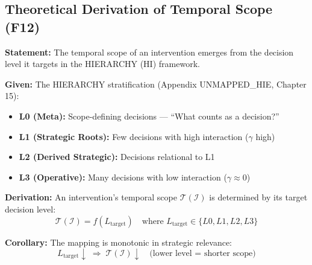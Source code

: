 \subsection{Theoretical Derivation of Temporal Scope (F12)}
\label{sec:hhh-temporal}

\begin{tcolorbox}[colback=blue!5!white, colframe=blue!75!black,
    title=\textbf{Theorem HHH-T2: Temporal Scope Emergence from HIERARCHY}]

\textbf{Statement:} The temporal scope of an intervention emerges from the decision level it targets in the HIERARCHY (HI) framework.

\textbf{Given:} The HIERARCHY stratification (Appendix UNMAPPED_HIE, Chapter 15):
\begin{itemize}[nosep]
    \item \textbf{L0 (Meta):} Scope-defining decisions --- ``What counts as a decision?''
    \item \textbf{L1 (Strategic Roots):} Few decisions with high interaction ($\gamma$ high)
    \item \textbf{L2 (Derived Strategic):} Decisions relational to L1
    \item \textbf{L3 (Operative):} Many decisions with low interaction ($\gamma \approx 0$)
\end{itemize}

\textbf{Derivation:} An intervention's temporal scope $\mathcal{T}(\mathcal{I})$ is determined by its target decision level:
\begin{equation}
\mathcal{T}(\mathcal{I}) = f(L_{\text{target}}) \quad \text{where } L_{\text{target}} \in \{L0, L1, L2, L3\}
\label{eq:hhh-temporal-mapping}
\end{equation}

\textbf{Corollary:} The mapping is monotonic in strategic relevance:
\begin{equation}
L_{\text{target}} \downarrow \; \Rightarrow \; \mathcal{T}(\mathcal{I}) \downarrow \quad \text{(lower level = shorter scope)}
\end{equation}

\end{tcolorbox}

